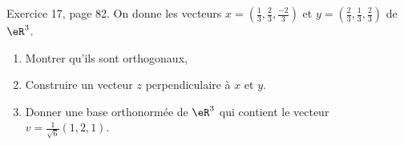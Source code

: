 
\begin{exercice}\label{exoLineraire0028}


	Exercice 17, page 82. On donne les vecteurs $x=(\frac{ 1 }{ 3 },\frac{ 2 }{ 3 },\frac{ -2 }{ 3 })$ et $y=(\frac{ 2 }{ 3 },\frac{ 1 }{ 3 },\frac{ 2}{ 3 })$ de $\eR^3$.
	\begin{enumerate}
		\item
			Montrer qu'ils sont orthogonaux,
		\item
			Construire un vecteur $z$ perpendiculaire à $x$ et $y$.

		\item
			Donner une base orthonormée de $\eR^3$ qui contient le vecteur $v=\frac{1}{ \sqrt{6} }(1,2,1)$.
		\end{enumerate}


\end{exercice}
